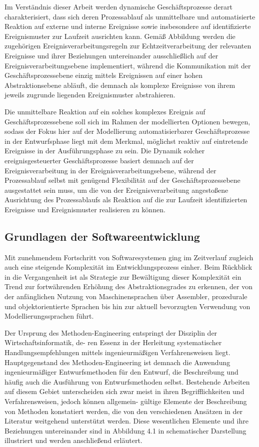 Im Verständnis dieser Arbeit werden dynamische Geschäftsprozesse derart charakterisiert, dass sich deren Prozessablauf als unmittelbare und automatisierte Reaktion auf externe und interne Ereignisse sowie insbesondere auf identifizierte Ereignismuster zur Laufzeit ausrichten kann. Gemäß Abbildung \todo{} werden die zugehörigen Ereignisverarbeitungsregeln zur Echtzeitverarbeitung der relevanten Ereignisse und ihrer Beziehungen untereinander ausschließlich auf der Ereignisverarbeitungsebene implementiert, während die Kommunikation mit der Geschäftsprozessebene einzig mittels Ereignissen auf einer hohen Abstraktionsebene abläuft, die demnach als komplexe Ereignisse von ihrem jeweils zugrunde liegenden Ereignismuster abstrahieren.

Die unmittelbare Reaktion auf ein solches komplexes Ereignis auf Geschäftsprozessebene soll sich im Rahmen der modellierten Optionen bewegen, sodass der Fokus hier auf der Modellierung automatisierbarer Geschäftsprozesse in der Entwurfsphase liegt mit dem Merkmal, möglichst reaktiv auf eintretende Ereignisse in der Ausführungsphase zu sein. Die Dynamik solcher ereignisgesteuerter Geschäftsprozesse basiert demnach auf der Ereignisverarbeitung in der Ereignisverarbeitungsebene, während der Prozessablauf selbst mit genügend Flexibilität auf der Geschäftsprozessebene ausgestattet sein muss, um die von der Ereignisverarbeitung angestoßene Ausrichtung des Prozessablaufs als Reaktion auf die zur Laufzeit identifizierten Ereignisse und Ereignismuster realisieren zu können.

\subsection{Grundlagen der Softwareentwicklung}
Mit zunehmendem Fortschritt von Softwaresystemen ging im Zeitverlauf zugleich auch eine steigende Komplexität im Entwicklungsprozess einher. Beim Rückblick in die Vergangenheit ist als Strategie zur Bewältigung dieser Komplexität ein Trend zur fortwährenden Erhöhung des Abstraktionsgrades zu erkennen, der von der anfänglichen Nutzung von Maschinensprachen über Assembler, prozedurale und objektorientierte Sprachen bis hin zur aktuell bevorzugten Verwendung von Modellierungssprachen führt.

Der Ursprung des Methoden-Engineering entspringt der Disziplin der Wirtschaftsinformatik, de- ren Essenz in der Herleitung systematischer Handlungsempfehlungen mittels ingenieurmäßigen Verfahrensweisen liegt. Hauptgegenstand des Methoden-Engineering ist demnach die Anwendung ingenieurmäßiger Entwurfsmethoden für den Entwurf, die Beschreibung und häufig auch die Ausführung von Entwurfsmethoden selbst. Bestehende Arbeiten auf diesem Gebiet unterscheiden sich zwar meist in ihren Begrifflichkeiten und Verfahrensweisen, jedoch können allgemein- gültige Elemente der Beschreibung von Methoden konstatiert werden, die von den verschiedenen Ansätzen in der Literatur weitgehend unterstützt werden. Diese wesentlichen Elemente und ihre Beziehungen untereinander sind in Abbildung 4.1 in schematischer Darstellung illustriert und werden anschließend erläutert. 

